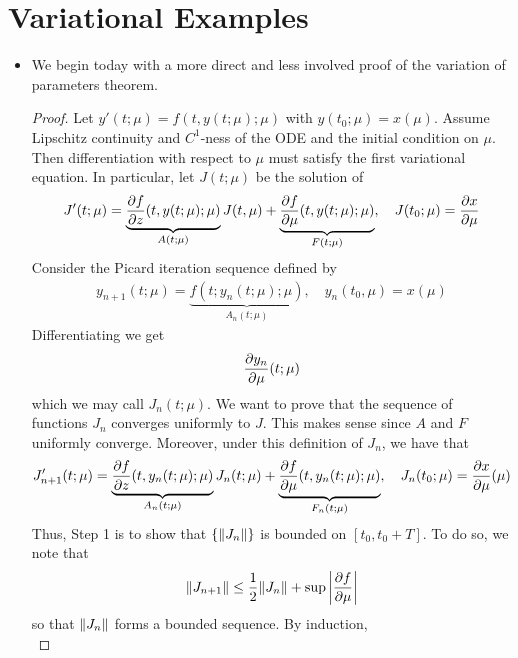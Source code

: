 \documentclass[../notes.tex]{subfiles}
\begin{document}
\section{Variational Examples}
\begin{itemize}
    \item {}We begin today with a more direct and less involved proof of the variation of parameters theorem.
    \begin{proof}
        Let $y'(t;\mu)=f(t,y(t;\mu);\mu)$ with $y(t_0;\mu)=x(\mu)$. Assume Lipschitz continuity and $C^1$-ness of the ODE and the initial condition on $\mu$. Then differentiation with respect to $\mu$ must satisfy the first variational equation. In particular, let $J(t;\mu)$ be the solution of
        \begin{equation*}
            J'(t;\mu) = \underbrace{{\pdv{f}{z}}(t,y(t;\mu);\mu)}_{A(t;\mu)}J(t,\mu)+\underbrace{{\pdv{f}{\mu}}(t,y(t;\mu);\mu)}_{F(t;\mu)}
            ,\quad
            J(t_0;\mu) = \pdv{x}{\mu}
        \end{equation*}
        Consider the Picard iteration sequence defined by
        \begin{align*}
            y_{n+1}(t;\mu) = \underbrace{f(t;y_n(t;\mu);\mu)}_{A_n(t;\mu)}
            ,\quad
            y_n(t_0,\mu) = x(\mu)
        \end{align*}
        Differentiating we get
        \begin{equation*}
            {\pdv{y_n}{\mu}}(t;\mu)
        \end{equation*}
        which we may call $J_n(t;\mu)$. We want to prove that the sequence of functions $J_n$ converges uniformly to $J$. This makes sense since $A$ and $F$ uniformly converge. Moreover, under this definition of $J_n$, we have that
        \begin{equation*}
            J_{n+1}'(t;\mu) = \underbrace{{\pdv{f}{z}}(t,y_n(t;\mu);\mu)}_{A_n(t;\mu)}J_n(t;\mu)+\underbrace{{\pdv{f}{\mu}}(t,y_n(t;\mu);\mu)}_{F_n(t;\mu)}
            ,\quad
            J_n(t_0;\mu) = {\pdv{x}{\mu}}(\mu)
        \end{equation*}
        Thus, Step 1 is to show that $\{\norm{J_n}\}$ is bounded on $[t_0,t_0+T]$. To do so, we note that
        \begin{equation*}
            \norm{J_{n+1}} \leq \frac{1}{2}\norm{J_n}+\sup\left| \pdv{f}{\mu} \right|
        \end{equation*}
        so that $\norm{J_n}$ forms a bounded sequence. By induction,
        \begin{equation*}

\end{equation*}
\end{proof}
\end{itemize}
\end{document}
